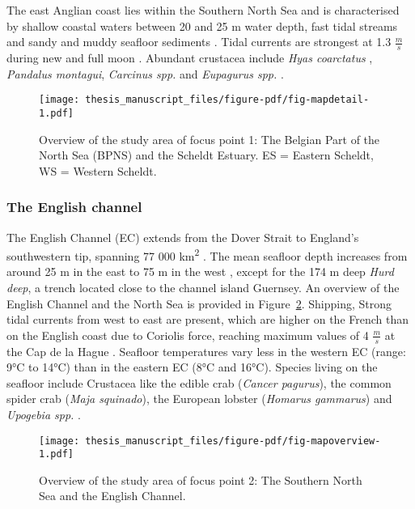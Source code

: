 \documentclass[
  authoryear,
  review,
  3p]{elsarticle}
\begin{document}
The east Anglian coast lies within the Southern North Sea and is
characterised by shallow coastal waters between 20 and 25 m water depth,
fast tidal streams and sandy and muddy seafloor sediments
\citep{harrison_1990}. Tidal currents are strongest at 1.3
\(\frac{m}{s}\) during new and full moon \citep{arnold_1994}. Abundant
crustacea include \emph{Hyas coarctatus} \citep{dyer_1985},
\emph{Pandalus montagui}, \emph{Carcinus spp.} and \emph{Eupagurus spp.}
\citep{sergeant_1951}.

\begin{figure}[H]

{\centering \texttt{[image: thesis\_manuscript\_files/figure-pdf/fig-mapdetail-1.pdf]}

}

\caption{\label{fig-mapdetail}Overview of the study area of focus point
1: The Belgian Part of the North Sea (BPNS) and the Scheldt Estuary. ES
= Eastern Scheldt, WS = Western Scheldt.}

\end{figure}

\hypertarget{sec-mmstudyareaec}{%
\subsubsection{The English channel}\label{sec-mmstudyareaec}}

The English Channel (EC) extends from the Dover Strait to England's
southwestern tip, spanning 77 000 km\textsuperscript{2}
\citep{dauvin_2012}. The mean seafloor depth increases from around 25 m
in the east to 75 m in the west \citep{dauvin_2012}, except for the 174
m deep \emph{Hurd deep}, a trench located close to the channel island
Guernsey. An overview of the English Channel and the North Sea is
provided in Figure~\ref{fig-mapoverview}. Shipping, Strong tidal
currents from west to east are present, which are higher on the French
than on the English coast due to Coriolis force, reaching maximum values
of 4 \(\frac{m}{s}\) at the Cap de la Hague \citep{salomon_1993}.
Seafloor temperatures vary less in the western EC (range: 9°C to 14°C)
than in the eastern EC (8°C and 16°C). Species living on the seafloor
include Crustacea like the edible crab (\emph{Cancer pagurus}), the
common spider crab (\emph{Maja squinado}), the European lobster
(\emph{Homarus gammarus}) and \emph{Upogebia spp.}
\citep{holme_1966, vaz_2007}.

\begin{figure}[H]

{\centering \texttt{[image: thesis\_manuscript\_files/figure-pdf/fig-mapoverview-1.pdf]}

}

\caption{\label{fig-mapoverview}Overview of the study area of focus
point 2: The Southern North Sea and the English Channel.}

\end{figure}
\end{document}
